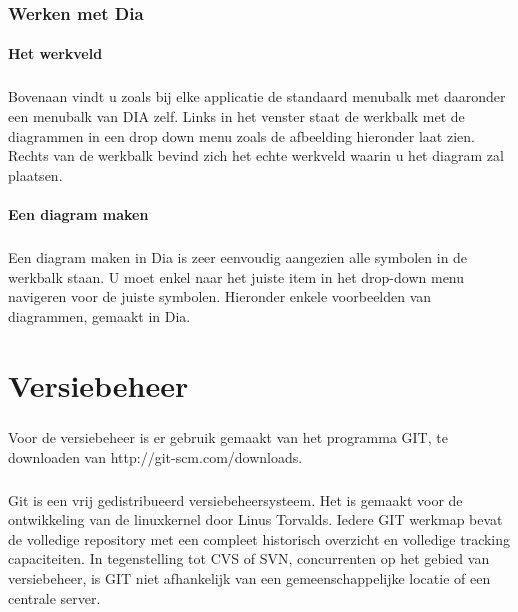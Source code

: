 \documentclass[12pt,a4paper]{report}
\begin{document}
\begin{flushleft}
\subsection*{Werken met Dia}
\subsubsection*{Het werkveld}
\paragraph*{}
Bovenaan vindt u zoals bij elke applicatie de standaard menubalk met daaronder een menubalk van DIA zelf. Links in het venster staat de werkbalk met de diagrammen in een drop down menu zoals de afbeelding hieronder laat zien. Rechts van de werkbalk bevind zich het echte werkveld waarin u het diagram zal plaatsen.
\linebreak

\subsubsection*{Een diagram maken}
\paragraph*{}
Een diagram maken in Dia is zeer eenvoudig aangezien alle symbolen in de werkbalk staan. U moet enkel naar het juiste item in het drop-down menu navigeren voor de juiste symbolen. Hieronder enkele voorbeelden van diagrammen, gemaakt in Dia.

\chapter{Versiebeheer}
\paragraph*{}
Voor de versiebeheer is er gebruik gemaakt van het programma GIT, te downloaden van http://git-scm.com/downloads.
\paragraph*{}
Git is een vrij gedistribueerd versiebeheersysteem. Het is gemaakt voor de ontwikkeling van de linuxkernel door Linus Torvalds. Iedere GIT werkmap bevat de volledige repository met een compleet historisch overzicht en volledige tracking capaciteiten. In tegenstelling tot CVS of SVN, concurrenten op het gebied van versiebeheer, is GIT niet afhankelijk van een gemeenschappelijke locatie of een centrale server.

\end{flushleft}
\end{document}
